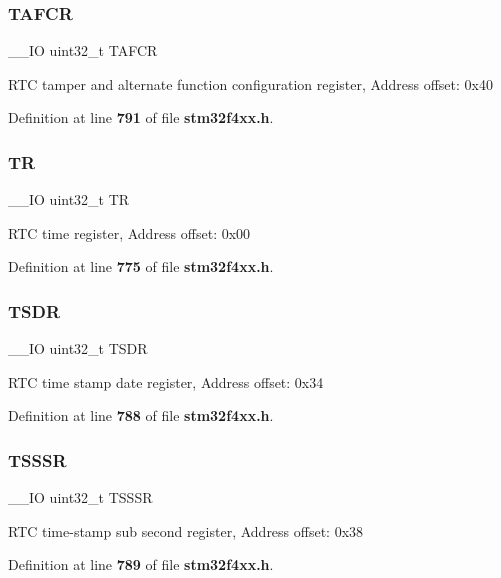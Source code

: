 \subsubsection{T\+A\+F\+CR}
{\footnotesize\ttfamily \+\_\+\+\_\+\+IO uint32\+\_\+t T\+A\+F\+CR}

R\+TC tamper and alternate function configuration register, Address offset\+: 0x40 

Definition at line \textbf{ 791} of file \textbf{ stm32f4xx.\+h}.

\mbox{\label{structRTC__TypeDef_a63d179b7a36a715dce7203858d3be132}} 
\subsubsection{TR}
{\footnotesize\ttfamily \+\_\+\+\_\+\+IO uint32\+\_\+t TR}

R\+TC time register, Address offset\+: 0x00 

Definition at line \textbf{ 775} of file \textbf{ stm32f4xx.\+h}.

\mbox{\label{structRTC__TypeDef_abeb6fb580a8fd128182aa9ba2738ac2c}} 
\subsubsection{T\+S\+DR}
{\footnotesize\ttfamily \+\_\+\+\_\+\+IO uint32\+\_\+t T\+S\+DR}

R\+TC time stamp date register, Address offset\+: 0x34 

Definition at line \textbf{ 788} of file \textbf{ stm32f4xx.\+h}.

\mbox{\label{structRTC__TypeDef_a1d6c2bc4c067d6a64ef30d16a5925796}} 
\subsubsection{T\+S\+S\+SR}
{\footnotesize\ttfamily \+\_\+\+\_\+\+IO uint32\+\_\+t T\+S\+S\+SR}

R\+TC time-\/stamp sub second register, Address offset\+: 0x38 

Definition at line \textbf{ 789} of file \textbf{ stm32f4xx.\+h}.

